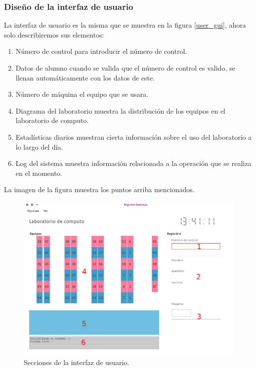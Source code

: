 \documentclass[12pt]{article} %
\begin{document}
		\subsubsection[GUI]{Dise\~no de la interfaz de usuario}
			La interfaz de usuario es la misma que se muestra en la figura \ref{user_gui}, ahora solo describiremos sus elementos:
			\begin{enumerate}
				\item N\'umero de control para introducir el n\'umero de control.
				\item Datos de alumno cuando se valida que el n\'umero de control es valido, se llenan automáticamente con los datos de este.
				\item N\'umero de m\'aquina el equipo que se usara.
				\item Diagrama del laboratorio muestra la distribución de los equipos en el laboratorio de computo. 
				\item Estadísticas diarios muestran cierta información sobre el uso del laboratorio a lo largo del día.
				\item Log del sistema muestra información relacionada a la operación que se realiza en el momento.
			\end{enumerate}
			La imagen de la figura muestra los puntos arriba mencionados.
			\begin{figure}[h!]%
				\centering
				\includegraphics[scale=0.4]{./imagenes/user_gui_num}
				\caption{Secciones de la interfaz de usuario.}\label{user_gui_num}
			\end{figure}
		
\end{document}
